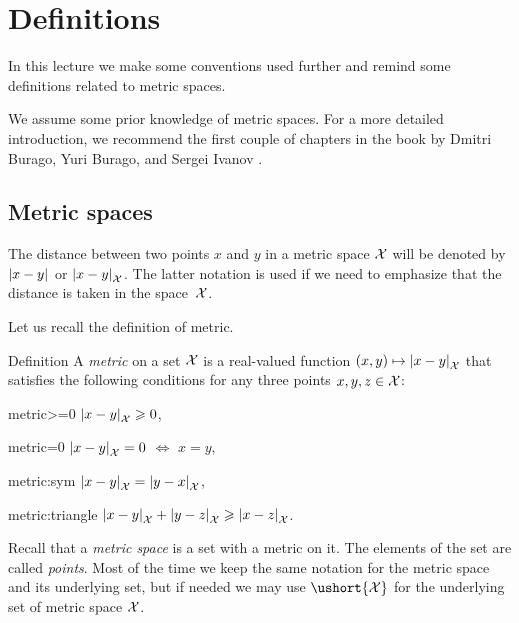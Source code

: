 \chapter{Definitions}

In this lecture we make some conventions used further
and remind some definitions related to metric spaces.

We assume some prior knowledge of metric spaces.
For a more detailed introduction, we recommend the first couple of chapters in the book by Dmitri Burago, Yuri Burago, and Sergei Ivanov \cite{burago-burago-ivanov}.

\section{Metric spaces}
\label{sec:metric spaces}

The distance between two points $x$ and $y$ in a metric space $\mathcal{X}$ will be denoted by $\dist{x}{y}{}$ or $\dist{x}{y}{\spc{X}}$.
The latter notation is used if we need to emphasize 
that the distance is taken in the space~${\mathcal{X}}$.

Let us recall the definition of metric. 

\begin{thm}{Definition}\label{def:metric}
A \emph{metric} on a set $\mathcal{X}$ is a real-valued function $(x,y)\z\mapsto\dist{x}{y}{\spc{X}}$ that satisfies the following conditions for any three points $x,y,z\in \mathcal{X}$:

\begin{subthm}{metric>=0}
$\dist{x}{y}{\spc{X}}\ge 0$,
\end{subthm}

\begin{subthm}{metric=0} $\dist{x}{y}{\spc{X}}= 0$ $\iff$ $x=y$,
\end{subthm}

\begin{subthm}{metric:sym} $\dist{x}{y}{\spc{X}}=\dist{y}{x}{\spc{X}}$,
\end{subthm}

\begin{subthm}{metric:triangle} $\dist{x}{y}{\spc{X}}+\dist{y}{z}{\spc{X}}\ge\dist{x}{z}{\spc{X}}$.
\end{subthm}

\end{thm}

Recall that a \emph{metric space} is a set with a metric on it.
The elements of the set are called \emph{points}. 
Most of the time we keep the same notation for the metric space and its underlying set,
but if needed we may use $\ushort{\spc{X}}$ for the underlying set of metric space $\mathcal{X}$.

